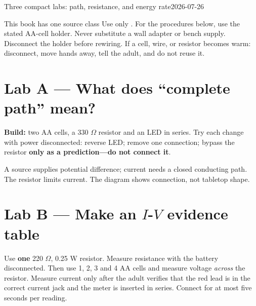 

  {Three compact labs: path, resistance, and energy rate}{2026-07-26}


\begin{teloshazard}{This book has one source class}
Use only \lowvoltage. For the procedures below, use the stated AA-cell holder.
Never substitute a wall adapter or bench supply. Disconnect the holder before
rewiring. If a cell, wire, or resistor becomes warm: disconnect, move hands
away, tell the adult, and do not reuse it.
\end{teloshazard}

\section{Lab A — What does “complete path” mean?}
\textbf{Build:} two AA cells, a 330 \(\Omega\) resistor and an LED in series.
Try each change with power disconnected: reverse LED; remove one connection;
bypass the resistor \textbf{only as a prediction—do not connect it}.

\begin{center}
\end{center}

A source supplies potential difference; current needs a closed conducting path.
The resistor limits current. The diagram shows connection, not tabletop shape.

\section{Lab B — Make an \(I\)-\(V\) evidence table}
Use \textbf{one} 220 \(\Omega\), 0.25 W resistor. Measure resistance with the
battery disconnected. Then use 1, 2, 3 and 4 AA cells and measure voltage
\emph{across} the resistor. Measure current only after the adult verifies that
the red lead is in the correct current jack and the meter is inserted in series.
Connect for at most five seconds per reading.


